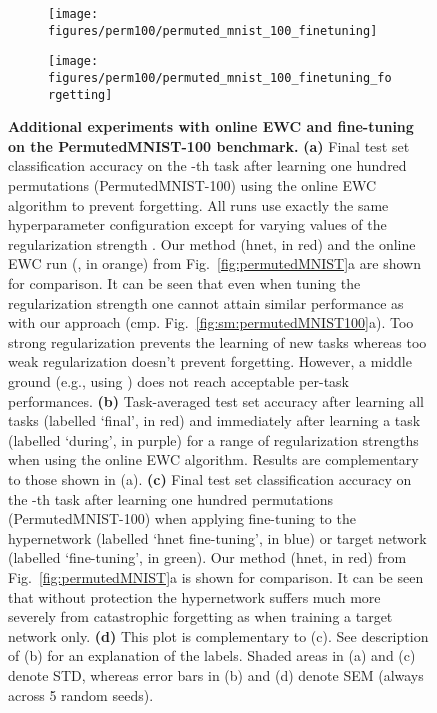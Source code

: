 \documentclass{article}
\begin{document}
\begin{figure}
    \begin{subfigure}{0.49\linewidth}
    \caption{}
    \texttt{[image: figures/perm100/permuted\_mnist\_100\_finetuning]}
    \end{subfigure}
    \begin{subfigure}{0.49\linewidth}
    \caption{}
    \texttt{[image: figures/perm100/permuted\_mnist\_100\_finetuning\_forgetting]}
    \end{subfigure}
    \caption{\textbf{Additional experiments with online EWC and fine-tuning on the PermutedMNIST-100 benchmark.} \textbf{(a)} Final test set classification accuracy on the -th task after learning one hundred permutations (PermutedMNIST-100) using the online EWC algorithm \citep{schwarz_progress_2018} to prevent forgetting. All runs use exactly the same hyperparameter configuration except for varying values of the regularization strength . Our method (hnet, in red) and the online EWC run (, in orange) from Fig.~\ref{fig:permutedMNIST}a are shown for comparison. It can be seen that even when tuning the regularization strength one cannot attain similar performance as with our approach (cmp. Fig.~\ref{fig:sm:permutedMNIST100}a). Too strong regularization prevents the learning of new tasks whereas too weak regularization doesn't prevent forgetting. However, a middle ground (e.g., using ) does not reach acceptable per-task performances. \textbf{(b)} Task-averaged test set accuracy after learning all tasks (labelled `final', in red) and immediately after learning a task (labelled `during', in purple) for a range of regularization strengths  when using the online EWC algorithm. Results are complementary to those shown in (a). \textbf{(c)} Final test set classification accuracy on the -th task after learning one hundred permutations (PermutedMNIST-100) when applying fine-tuning to the hypernetwork (labelled `hnet fine-tuning', in blue) or target network (labelled `fine-tuning', in green). Our method (hnet, in red) from Fig.~\ref{fig:permutedMNIST}a is shown for comparison. It can be seen that without protection the hypernetwork suffers much more severely from catastrophic forgetting as when training a target network only.
    \textbf{(d)} This plot is complementary to (c). See description of (b) for an explanation of the labels.
    Shaded areas in (a) and (c) denote STD, whereas error bars in (b) and (d) denote SEM (always across 5 random seeds).\label{fig:sm:permutedMNIST100:onewc:ft}}
\end{figure}
\end{document}
